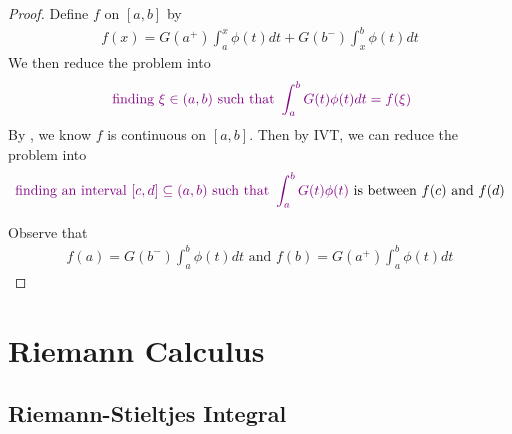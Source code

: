 \documentclass{report}
\begin{document}
\begin{proof}
Define $f$ on  $[a,b]$ by 
\begin{align*}
f(x)=G(a^+)\int_a^x \phi(t)dt+G(b^-)\int_x^b \phi(t)dt
\end{align*}
We then reduce the problem into 
\begin{align*}
\textcolor{violet}{\text{ finding }\xi \in (a,b)\text{ such that }\int_a^b G(t)\phi (t)dt=f(\xi)}
\end{align*}
By , we know $f$ is continuous on  $[a,b]$. Then by IVT, we can reduce the problem into 
\begin{align*}
\textcolor{violet}{\text{ finding an interval $[c,d]\subseteq (a,b)$ such that }\int_a^b G(t)\phi (t)}\text{ is between $f(c) $ and $f(d)$ }
\end{align*}


Observe that 
\begin{align*}
f(a)=G(b^-)\int_a^b \phi(t)dt\text{ and }f(b)=G(a^+)\int_a^b \phi(t)dt 
\end{align*}




\end{proof} 
\chapter{Riemann Calculus}
\section{Riemann-Stieltjes Integral}
\end{document}
